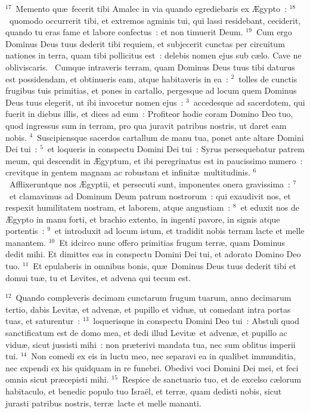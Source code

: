${}^{17}$~Memento qu\ae\ fecerit tibi Amalec in via quando egrediebaris ex \AE gypto~:
${}^{18}$~quomodo occurrerit tibi, et extremos agminis tui, qui lassi residebant, ceciderit, quando tu eras fame et labore confectus~: et non timuerit Deum.
${}^{19}$~Cum ergo Dominus Deus tuus dederit tibi requiem, et subjecerit cunctas per circuitum nationes in terra, quam tibi pollicitus est~: delebis nomen ejus sub c\ae lo. Cave ne obliviscaris.
~Cumque intraveris terram, quam Dominus Deus tuus tibi daturus est possidendam, et obtinueris eam, atque habitaveris in ea~:
${}^{2}$~tolles de cunctis frugibus tuis primitias, et pones in cartallo, pergesque ad locum quem Dominus Deus tuus elegerit, ut ibi invocetur nomen ejus~:
${}^{3}$~accedesque ad sacerdotem, qui fuerit in diebus illis, et dices ad eum~: Profiteor hodie coram Domino Deo tuo, quod ingressus sum in terram, pro qua juravit patribus nostris, ut daret eam nobis.
${}^{4}$~Suscipiensque sacerdos cartallum de manu tua, ponet ante altare Domini Dei tui~:
${}^{5}$~et loqueris in conspectu Domini Dei tui~: Syrus persequebatur patrem meum, qui descendit in \AE gyptum, et ibi peregrinatus est in paucissimo numero~: crevitque in gentem magnam ac robustam et infinit\ae\ multitudinis.
${}^{6}$~Afflixeruntque nos \AE gyptii, et persecuti sunt, imponentes onera gravissima~:
${}^{7}$~et clamavimus ad Dominum Deum patrum nostrorum~: qui exaudivit nos, et respexit humilitatem nostram, et laborem, atque angustiam~:
${}^{8}$~et eduxit nos de \AE gypto in manu forti, et brachio extento, in ingenti pavore, in signis atque portentis~:
${}^{9}$~et introduxit ad locum istum, et tradidit nobis terram lacte et melle manantem.
${}^{10}$~Et idcirco nunc offero primitias frugum terr\ae , quam Dominus dedit mihi. Et dimittes eas in conspectu Domini Dei tui, et adorato Domino Deo tuo.
${}^{11}$~Et epulaberis in omnibus bonis, qu\ae\ Dominus Deus tuus dederit tibi et domui tu\ae , tu et Levites, et advena qui tecum est.


${}^{12}$~Quando compleveris decimam cunctarum frugum tuarum, anno decimarum tertio, dabis Levit\ae , et adven\ae , et pupillo et vidu\ae , ut comedant intra portas tuas, et saturentur~:
${}^{13}$~loquerisque in conspectu Domini Deo tui~: Abstuli quod sanctificatum est de domo mea, et dedi illud Levit\ae\ et adven\ae , et pupillo ac vidu\ae , sicut jussisti mihi~: non pr\ae terivi mandata tua, nec sum oblitus imperii tui.
${}^{14}$~Non comedi ex eis in luctu meo, nec separavi ea in qualibet immunditia, nec expendi ex his quidquam in re funebri. Obedivi voci Domini Dei mei, et feci omnia sicut pr\ae cepisti mihi.
${}^{15}$~Respice de sanctuario tuo, et de excelso c\ae lorum habitaculo, et benedic populo tuo Isra\"el, et terr\ae , quam dedisti nobis, sicut jurasti patribus nostris, terr\ae\ lacte et melle mananti.


